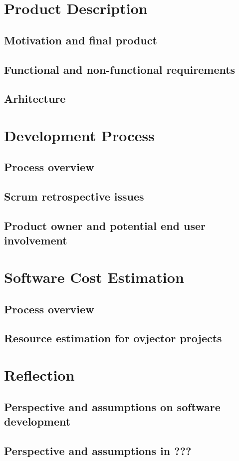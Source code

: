 \documentclass{article}
\begin{document}
\section{Product Description}
\subsection{Motivation and final product}

\subsection{Functional and non-functional requirements}

\subsection{Arhitecture}


\section{Development Process}
\subsection{Process overview}

\subsection{Scrum retrospective issues}

\subsection{Product owner and potential end user involvement}


\section{Software Cost Estimation}
\subsection{Process overview}

\subsection{Resource estimation for ovjector projects}


\section{Reflection}
\subsection{Perspective and assumptions on software development}

\subsection{Perspective and assumptions in ???}



\end{document}
